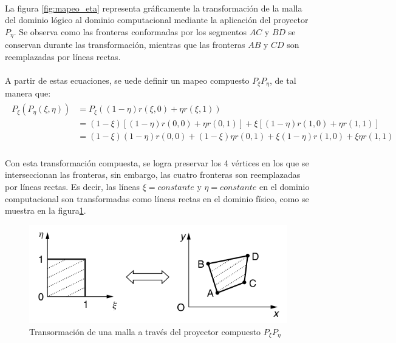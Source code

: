 \documentclass[letterpaper, openright, 12pt]{book}
\begin{document}
    \paragraph*{}
        La figura \ref{fig:mapeo_eta} representa gráficamente la transformación
        de la malla del dominio lógico al dominio computacional mediante la
        aplicación del proyector $P_{\eta}$. Se observa como las fronteras
        conformadas por los segmentos $AC$ y $BD$ se conservan durante las
        transformación, mientras que las fronteras $AB$ y $CD$ son reemplazadas
        por líneas rectas.
    \paragraph*{}
        A partir de estas ecuaciones, se uede definir un mapeo compuesto
        $P_{\xi}P_{\eta}$, de tal manera que:
        \begin{align}
            \begin{aligned}
                P_{\xi}(P_{\eta}(\xi, \eta)) &= P_{\xi} ((1 - \eta)r(\xi, 0) + \eta r(\xi, 1)) \\
                &= (1 - \xi) \left[ (1 - \eta)r(0, 0) + \eta r(0, 1) \right] + \xi \left[ (1 - \eta)r(1, 0) + \eta r(1,1) \right]\\
                &= (1 - \xi)(1 - \eta)r(0, 0) + (1-\xi)\eta r(0, 1) + \xi(1 - \eta)r(1, 0) + \xi\eta r(1, 1)
            \end{aligned}
        \end{align}
    \paragraph*{}
        Con esta transformación compuesta, se logra preservar los 4 vértices en
        los que se interseccionan las fronteras, sin embargo, las cuatro
        fronteras son reemplazadas por líneas rectas. Es decir, las líneas
        $\xi = constante$ y $\eta = constante$ en el dominio computacional son
        transformadas como líneas rectas en el dominio físico, como se muestra
        en la figura\ref{fig:mapeo_xieta}.
        \begin{figure}[htbp!]
            \centering
            \includegraphics[width=120mm]{./Imagenes/mapeo_xieta}
            \caption[Transformación de malla por $P_{\xi}P_{\eta}$]{Transormación
            de una malla a través del proyector compuesto
            $P_{\xi}P_{\eta}$\cite{farrashkhalvat}}
            \label{fig:mapeo_xieta}
        \end{figure}
\end{document}

